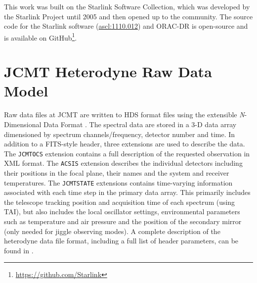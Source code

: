 \documentclass[useAMS,usenatbib]{mn2e}
\newcommand{\ascl}[1]{\href{http://www.ascl.net/#1}{ascl:#1}}
\begin{document}
This work was built on the Starlink Software Collection, which was
developed by the Starlink Project until 2005
\citep{1982QJRAS..23..485D,2005ASPC..347...22D,2008ASPC..394..650C}
and then opened up to the community. The source code for the Starlink
software (\ascl{1110.012}) and ORAC-DR is open-source and is
available on GitHub\footnote{\url{https://github.com/Starlink}}.

\appendix

\section{JCMT Heterodyne Raw Data Model}
\label{sec:rawdata}

Raw data files at JCMT are written to HDS format files
\citep[e.g.,][\ascl{1502.009}]{2015HDS} using the extensible \emph{N}-Dimensional
Data Format \citep[NDF;][\ascl{1411.023}]{2015NDF}. The spectral data are stored in a
3-D data array dimensioned by spectrum channels/frequency, detector
number and time. In addition to a FITS-style header, three extensions
are used to describe the data. The \texttt{JCMTOCS} extension contains
a full description of the requested observation in XML format. The
\texttt{ACSIS} extension describes the individual detectors including
their positions in the focal plane, their names and the system and
receiver temperatures. The \texttt{JCMTSTATE} extensions contains
time-varying information associated with each time step in the primary
data array. This primarily includes the telescope tracking position
and acquisition time of each spectrum (using TAI), but also includes
the local oscillator settings, environmental parameters such as
temperature and air pressure and the position of the secondary mirror
(only needed for jiggle observing modes).  A complete description of
the heterodyne data file format, including a full list of header
parameters, can be found in \citet{OCS_ICD_022}.
\end{document}
